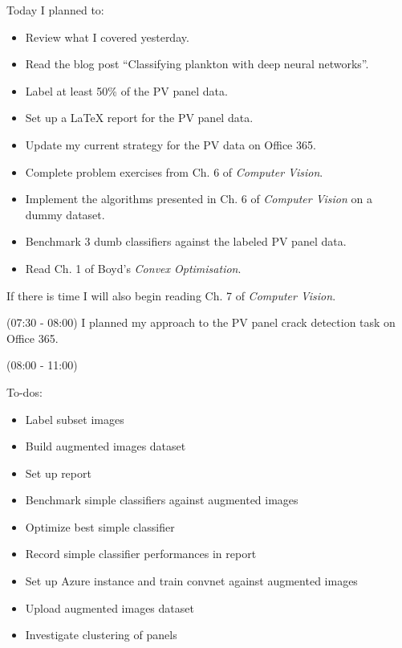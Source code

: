 \documentclass[idxtotoc,hyperref,openany]{labbook} %
\begin{document}
Today I planned to:
\begin{itemize}
	\item Review what I covered yesterday.
	\item Read the blog post ``Classifying plankton with deep neural networks''.
	\item Label at least 50\% of the PV panel data.
	\item Set up a LaTeX report for the PV panel data.
	\item Update my current strategy for the PV data on Office 365.
	\item Complete problem exercises from Ch. 6 of \emph{Computer Vision}.
	\item Implement the algorithms presented in Ch. 6 of \emph{Computer Vision} on a dummy dataset.
	\item Benchmark 3 dumb classifiers against the labeled PV panel data.
	\item Read Ch. 1 of Boyd's \emph{Convex Optimisation}.
\end{itemize}
If there is time I will also begin reading Ch. 7 of \emph{Computer Vision}.

(07:30 - 08:00) I planned my approach to the PV panel crack detection task on Office 365.

(08:00 - 11:00) 

To-dos:
\begin{itemize}
	\item Label subset images
	\item Build augmented images dataset
	\item Set up report
	\item Benchmark simple classifiers against augmented images
	\item Optimize best simple classifier
	\item Record simple classifier performances in report
	\item Set up Azure instance and train convnet against augmented images
	\item Upload augmented images dataset
	\item Investigate clustering of panels
\end{itemize}
\end{document}
